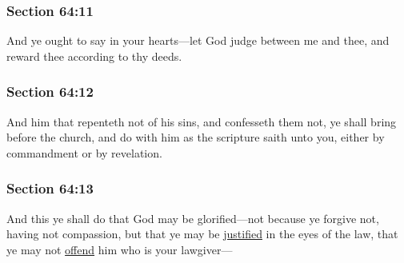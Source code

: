 	\subsubsection{Section 64:11} %
		\label{DC64-11}

		And ye ought to say in your hearts---let God judge between me and thee, and reward thee according to thy deeds.


	\subsubsection{Section 64:12} %
		\label{DC64-12}

		And him that repenteth not of his sins, and confesseth them not, ye shall bring before the church, and do with him as the scripture saith unto you, either by commandment or by revelation.


	\subsubsection{Section 64:13} %
		\label{DC64-13}

		And this ye shall do that God may be glorified---not because ye forgive not, having not compassion, but that ye may be \hyperref[JUSTIFICATION]{justified} in the eyes of the law, that ye may not \hyperref[OFFENSE]{offend} him who is your lawgiver---


